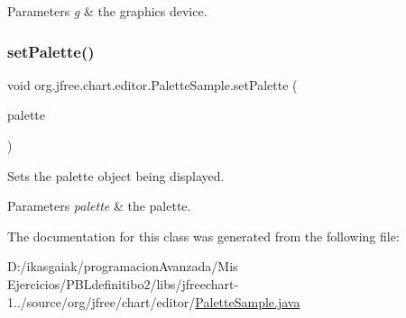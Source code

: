 \begin{DoxyParams}{Parameters}
{\em g} & the graphics device. \\
\hline
\end{DoxyParams}
\mbox{\label{classorg_1_1jfree_1_1chart_1_1editor_1_1_palette_sample_a55a8fa2faf2e6839f9e7725752551af2}} 
\subsubsection{\texorpdfstring{set\+Palette()}{setPalette()}}
{\footnotesize\ttfamily void org.\+jfree.\+chart.\+editor.\+Palette\+Sample.\+set\+Palette (\begin{DoxyParamCaption}\item[{\mbox{\hyperlink{classorg_1_1jfree_1_1chart_1_1plot_1_1_color_palette}{Color\+Palette}}}]{palette }\end{DoxyParamCaption})}

Sets the palette object being displayed.


\begin{DoxyParams}{Parameters}
{\em palette} & the palette. \\
\hline
\end{DoxyParams}


The documentation for this class was generated from the following file\+:\begin{DoxyCompactItemize}
\item 
D\+:/ikasgaiak/programacion\+Avanzada/\+Mis Ejercicios/\+P\+B\+Ldefinitibo2/libs/jfreechart-\/1../source/org/jfree/chart/editor/\mbox{\hyperlink{_palette_sample_8java}{Palette\+Sample.\+java}}\end{DoxyCompactItemize}
